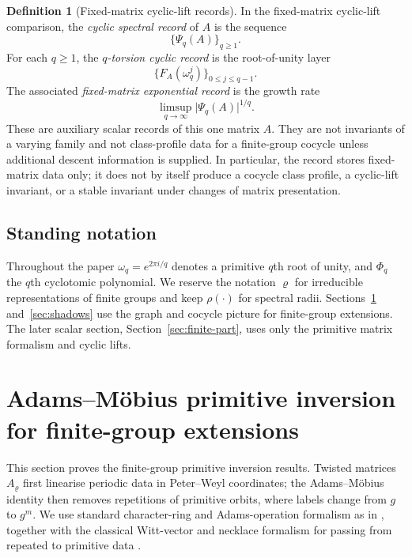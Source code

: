 \documentclass[11pt,a4paper]{amsart}
\theoremstyle{plain}
\theoremstyle{definition}
\newtheorem{definition}[theorem]{Definition}
\theoremstyle{remark}
\newcommand{\abs}[1]{\lvert #1 \rvert}
\begin{document}
\begin{definition}[Fixed-matrix cyclic-lift records]
  \label{def:spectral-fingerprints}
  In the fixed-matrix cyclic-lift comparison, the
  \emph{cyclic spectral record} of \(A\) is the sequence
  \[
    \{\Psi_q(A)\}_{q\ge 1}.
  \]
  For each \(q\ge 1\), the \emph{\(q\)-torsion cyclic record} is the
  root-of-unity layer
  \[
    \{F_A(\omega_q^j)\}_{0\le j\le q-1}.
  \]
  The associated \emph{fixed-matrix exponential record} is the growth rate
  \[
    \limsup_{q\to\infty}\abs{\Psi_q(A)}^{1/q}.
  \]
  These are auxiliary scalar records of this one matrix \(A\). They are
  not invariants of a varying family and not class-profile data for a
  finite-group cocycle unless additional descent information is supplied. In
  particular, the record stores fixed-matrix data only; it does not by
  itself produce a cocycle class profile, a cyclic-lift invariant, or a
  stable invariant under changes of matrix presentation.
\end{definition}

\subsection{Standing notation}

Throughout the paper \(\omega_q=e^{2\pi i/q}\) denotes a primitive
\(q\)th root of unity, and \(\Phi_q\) the \(q\)th cyclotomic
polynomial. We reserve the notation \(\varrho\) for irreducible
representations of finite groups and keep \(\rho(\cdot)\) for spectral
radii. Sections~\ref{sec:chebotarev} and~\ref{sec:shadows} use the
graph and cocycle picture for finite-group extensions. The later scalar
section, Section~\ref{sec:finite-part}, uses only the primitive matrix
formalism and cyclic lifts.



\section{Adams--M\"obius primitive inversion for finite-group extensions}
\label{sec:chebotarev}

This section proves the finite-group primitive inversion results. Twisted matrices
\(A_\varrho\) first linearise periodic data in Peter--Weyl coordinates;
the Adams--M\"obius identity then removes repetitions of primitive
orbits, where labels change from \(g\) to \(g^m\). We use standard
character-ring and Adams-operation formalism as in
\cite{AtiyahTall1969GroupRepresentationsLambdaRings,Serre1977LinearRepresentations,Knutson1973LambdaRings}, together with
the classical Witt-vector and necklace formalism for passing from
repeated to primitive data
\cite{DressSiebeneicher1988BurnsideRing,MetropolisRota1983Necklaces,Wehrhahn1990AperiodicRings}.
\end{document}
